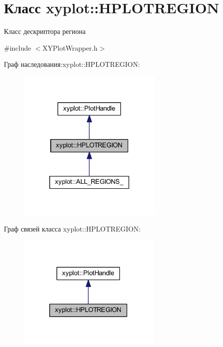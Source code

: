 \hypertarget{classxyplot_1_1_h_p_l_o_t_r_e_g_i_o_n}{\section{Класс xyplot\-:\-:H\-P\-L\-O\-T\-R\-E\-G\-I\-O\-N}
\label{classxyplot_1_1_h_p_l_o_t_r_e_g_i_o_n}
}


Класс дескриптора региона  




{\ttfamily \#include $<$X\-Y\-Plot\-Wrapper.\-h$>$}



Граф наследования\-:xyplot\-:\-:H\-P\-L\-O\-T\-R\-E\-G\-I\-O\-N\-:\nopagebreak
\begin{figure}[H]
\begin{center}
\leavevmode
\includegraphics[width=201pt]{classxyplot_1_1_h_p_l_o_t_r_e_g_i_o_n__inherit__graph}
\end{center}
\end{figure}


Граф связей класса xyplot\-:\-:H\-P\-L\-O\-T\-R\-E\-G\-I\-O\-N\-:\nopagebreak
\begin{figure}[H]
\begin{center}
\leavevmode
\includegraphics[width=198pt]{classxyplot_1_1_h_p_l_o_t_r_e_g_i_o_n__coll__graph}
\end{center}
\end{figure}
